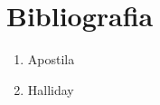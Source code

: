\newpage
\section{Bibliografia}

\begin{enumerate}
    \item Apostila
    \item Halliday
\end{enumerate}
